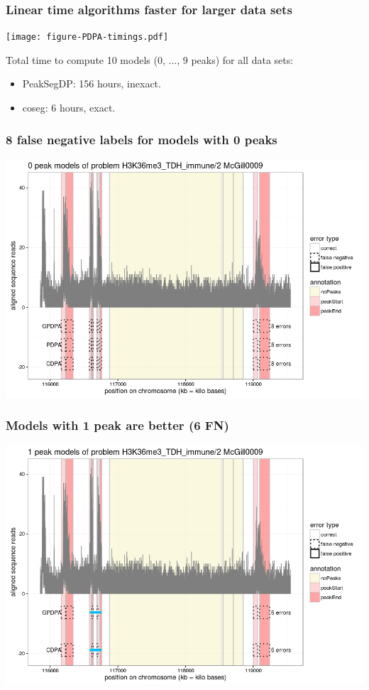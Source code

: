 \documentclass{beamer}
\begin{document}
\begin{frame}
  \frametitle{Linear time algorithms faster for larger data sets}
  \texttt{[image: figure-PDPA-timings.pdf]}

  Total time to compute 10 models (0, ..., 9 peaks) for all data sets:
  \begin{itemize}
  \item PeakSegDP: 156 hours, inexact.
  \item coseg: 6 hours, exact.
  \end{itemize}
\end{frame}

\begin{frame}
  \frametitle{8 false negative labels for models with 0 peaks}
  \includegraphics[width=\textwidth]{figure-min-train-error-problem5-0peaks}
\end{frame}

\begin{frame}
  \frametitle{Models with 1 peak are better (6 FN)}
  \includegraphics[width=\textwidth]{figure-min-train-error-problem5-1peaks}
\end{frame}
\end{document}
